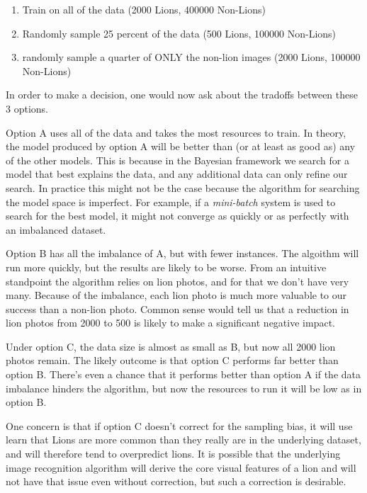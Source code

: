 \documentclass[twoside]{article}
\begin{document}
\begin{enumerate}[label=(\Alph*)]
\item Train on all of the data (2000 Lions, 400000 Non-Lions)
\item Randomly sample 25 percent of the data (500 Lions, 100000 Non-Lions)
\item  randomly sample a quarter of ONLY the non-lion images (2000 Lions, 100000 Non-Lions)
\end{enumerate}

In order to make a decision, one would now ask about the tradoffs between these 3 options.

Option A uses all of the data and takes the most resources to train. In theory, the model produced by option A will be better than (or at least as good as) any of the other models. This is because in the Bayesian framework we search for a model that best explains the data, and any additional data can only refine our search. In practice this might not be the case because the algorithm for searching the model space is imperfect. For example, if a \textit{mini-batch} system is used to search for the best model, it might not converge as quickly or as perfectly with an imbalanced dataset.

Option B has all the imbalance of A, but with fewer instances. The algoithm will run more quickly, but the results are likely to be worse. From an intuitive standpoint the algorithm relies on lion photos, and for that we don't have very many. Because of the imbalance, each lion photo is much more valuable to our success than a non-lion photo. Common sense would tell us that a reduction in lion photos from 2000 to 500 is likely to make a significant negative impact.

Under option C, the data size is almost as small as B, but now all 2000 lion photos remain. The likely outcome is that option C performs far better than option B. There's even a chance that it performs better than option A if the data imbalance hinders the algorithm, but now the resources to run it will be low as in option B.

One concern is that if option C doesn't correct for the sampling bias, it will use learn that Lions are more common than they really are in the underlying dataset, and will therefore tend to overpredict lions. It is possible that the underlying image recognition algorithm will derive the core visual features of a lion and will not have that issue even without correction, but such a correction is desirable.
\end{document}

